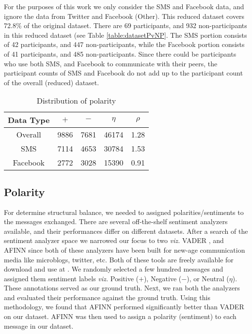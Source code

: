 For the purposes of this work we only consider the SMS and Facebook data, and ignore the data from Twitter and Facebook (Other). 
This reduced dataset covers 72.8\% of the original dataset. 
There are 69 participants, and 932 non-participants in this reduced dataset (see Table \ref{table:datasetPvNP}. 
The SMS portion consists of 42 participants, and 447 non-participants, while the Facebook portion consists of 41 participants, and 485 non-participants. 
Since there could be participants who use both SMS, and Facebook to communicate with their peers, the participant counts of SMS and Facebook do not add up to the participant count of the overall (reduced) dataset. 
\begin{table}[h]
\centering
\caption{Distribution of polarity}
\begin{tabular}{| c | c | c | c | c |}
\hline
\textbf{Data Type} & \textbf{$+$} & \textbf{$-$} & \textbf{$\eta$} & $\rho$\\
\hline
Overall & 9886 & 7681 & 46174 & 1.28\\
\hline
SMS & 7114 & 4653 & 30784 & 1.53\\
\hline
Facebook & 2772 & 3028 & 15390 & 0.91\\
\hline
\end{tabular}
\label{table:polarityDist}
\end{table}

\subsection{Polarity}
For determine structural balance, we needed to assigned polarities/sentiments to the messages exchanged. There are several off-the-shelf sentiment analyzers available, and their performances differ on different datasets. 
After a search of the sentiment analyzer space we narrowed our focus to two \emph{viz.} VADER \cite{hutto2014vader}, and AFINN \cite{nielsen2011new} since both of these analyzers have been built for new-age communication media like microblogs, twitter, etc. 
Both of these tools are freely available for download and use at \cite{vader2016github, afinn2016github}. 
We randomly selected a few hundred messages and assigned them sentiment labels \emph{viz.} Positive ($+$), Negative ($-$), or Neutral ($\eta$). 
These annotations served as our ground truth. 
Next, we ran both the analyzers and evaluated their performance against the ground truth. 
Using this methodology, we found that AFINN performed significantly better than VADER on our dataset. 
AFINN was then used to assign a polarity (sentiment) to each message in our dataset. 

